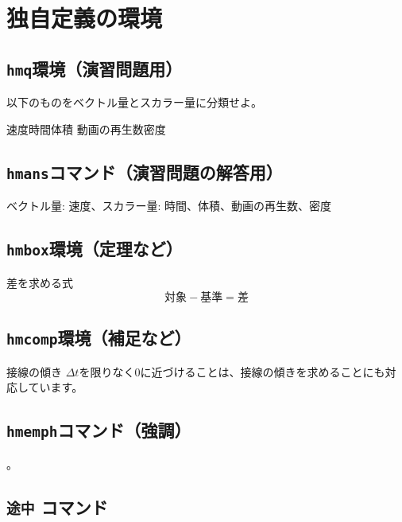 \documentclass[./body]{subfiles}
\begin{document}
\section{独自定義の環境}

\subsection{\texttt{hmq}環境（演習問題用）}

\begin{hmq}\label{vec:scq}
以下のものをベクトル量とスカラー量に分類せよ。

\noindent
\phantom{.}\hfill{速度}\hfill{時間}\hfill{体積}
\hfill{動画の再生数}\hfill{密度}\hfill\phantom{.}
\end{hmq}

\subsection{\texttt{hmans}コマンド（演習問題の解答用）}

\textsf{ベクトル量}: 速度、\textsf{スカラー量}: 時間、体積、動画の再生数、密度

\subsection{\texttt{hmbox}環境（定理など）}

\begin{hmbox}{差を求める式}
\[\text{対象}-\text{基準}=\text{差}\label{vec:diff2}\]
\end{hmbox}

\subsection{\texttt{hmcomp}環境（補足など）}

\begin{hmcomp}{接線の傾き}
$\Delta t$を限りなく$0$に近づけることは、接線の傾きを求めることにも対応しています。
\end{hmcomp}

\subsection{\texttt{hmemph}コマンド（強調）}

。

\subsection{\texttt{途中} コマンド}
\end{document}
